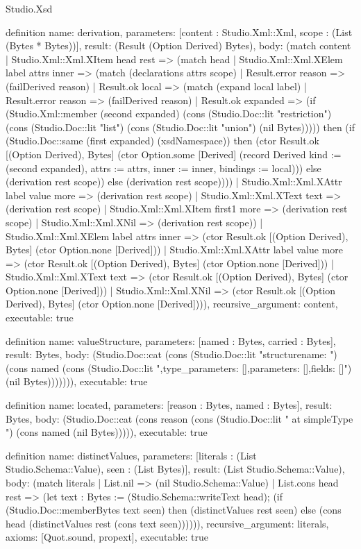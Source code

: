 \begin{lexlean}{Studio.Xsd}
\begin{semanticmodule}
definition{
  name: derivation,
  parameters: [content : Studio.Xml::Xml, scope : (List (Bytes * Bytes))],
  result: (Result (Option Derived) Bytes),
  body: (match content
    | Studio.Xml::Xml.XItem head rest => (match head
      | Studio.Xml::Xml.XElem label attrs inner => (match (declarations attrs scope)
        | Result.error reason => (failDerived reason)
        | Result.ok local => (match (expand local label)
          | Result.error reason => (failDerived reason)
          | Result.ok expanded => (if (Studio.Xml::member (second expanded) (cons (Studio.Doc::lit "restriction") (cons (Studio.Doc::lit "list") (cons (Studio.Doc::lit "union") (nil Bytes))))) then (if (Studio.Doc::same (first expanded) (xsdNamespace)) then (ctor Result.ok [(Option Derived), Bytes] (ctor Option.some [Derived] (record Derived {kind := (second expanded), attrs := attrs, inner := inner, bindings := local}))) else (derivation rest scope)) else (derivation rest scope))))
      | Studio.Xml::Xml.XAttr label value more => (derivation rest scope)
      | Studio.Xml::Xml.XText text => (derivation rest scope)
      | Studio.Xml::Xml.XItem first1 more => (derivation rest scope)
      | Studio.Xml::Xml.XNil => (derivation rest scope))
    | Studio.Xml::Xml.XElem label attrs inner => (ctor Result.ok [(Option Derived), Bytes] (ctor Option.none [Derived]))
    | Studio.Xml::Xml.XAttr label value more => (ctor Result.ok [(Option Derived), Bytes] (ctor Option.none [Derived]))
    | Studio.Xml::Xml.XText text => (ctor Result.ok [(Option Derived), Bytes] (ctor Option.none [Derived]))
    | Studio.Xml::Xml.XNil => (ctor Result.ok [(Option Derived), Bytes] (ctor Option.none [Derived]))),
  recursive_argument: content,
  executable: true
}

definition{
  name: valueStructure,
  parameters: [named : Bytes, carried : Bytes],
  result: Bytes,
  body: (Studio.Doc::cat (cons (Studio.Doc::lit "structure{\n  name: ") (cons named (cons (Studio.Doc::lit ",\n  type_parameters: [],\n  parameters: [],\n  fields: [\n  ]\n}\n") (nil Bytes))))))),
  executable: true
}

definition{
  name: located,
  parameters: [reason : Bytes, named : Bytes],
  result: Bytes,
  body: (Studio.Doc::cat (cons reason (cons (Studio.Doc::lit " at simpleType ") (cons named (nil Bytes))))),
  executable: true
}

definition{
  name: distinctValues,
  parameters: [literals : (List Studio.Schema::Value), seen : (List Bytes)],
  result: (List Studio.Schema::Value),
  body: (match literals
    | List.nil => (nil Studio.Schema::Value)
    | List.cons head rest => (let text : Bytes := (Studio.Schema::writeText head); (if (Studio.Doc::memberBytes text seen) then (distinctValues rest seen) else (cons head (distinctValues rest (cons text seen)))))),
  recursive_argument: literals,
  axioms: [Quot.sound, propext],
  executable: true
}


\end{semanticmodule}
\end{lexlean}
